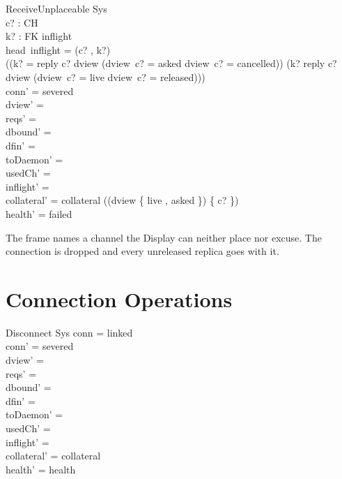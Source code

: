 \documentclass[a4paper,10pt,fleqn]{article}
\begin{document}
\begin{schema}{ReceiveUnplaceable}
  \Delta Sys \\
  c? : CH \\
  k? : FK
\where
  inflight \neq \langle \rangle \\
  head~inflight = (c? , k?) \\
  \lnot ((k? = reply \land c? \in \dom dview \land
      (dview~c? = asked \lor dview~c? = cancelled)) \lor
    (k? \neq reply \land c? \in \dom dview \land
      (dview~c? = live \lor dview~c? = released))) \\
  conn' = severed \\
  dview' = \emptyset \\
  reqs' = \emptyset \\
  dbound' = \emptyset \\
  dfin' = \emptyset \\
  toDaemon' = \emptyset \\
  usedCh' = \emptyset \\
  inflight' = \langle \rangle \\
  collateral' = collateral \cup
    (\dom (dview \rres \{ live , asked \}) \setminus \{ c? \}) \\
  health' = failed
\end{schema}

The frame names a channel the Display can neither place nor excuse.  The
connection is dropped and every unreleased replica goes with it.

\section{Connection Operations}

\begin{schema}{Disconnect}
  \Delta Sys
\where
  conn = linked \\
  conn' = severed \\
  dview' = \emptyset \\
  reqs' = \emptyset \\
  dbound' = \emptyset \\
  dfin' = \emptyset \\
  toDaemon' = \emptyset \\
  usedCh' = \emptyset \\
  inflight' = \langle \rangle \\
  collateral' = collateral \\
  health' = health
\end{schema}
\end{document}

